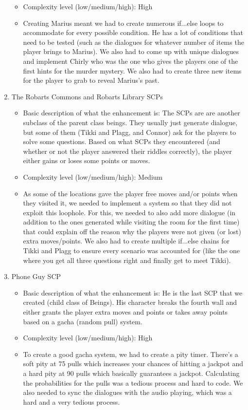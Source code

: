 \documentclass[11pt]{article}
\begin{document}
\begin{enumerate}
\begin{itemize}
    \item Complexity level (low/medium/high): High
    \item Creating Marius meant we had to create numerous if...else loops to accommodate for every possible condition. He has a lot of conditions that need to be tested (such as the dialogues for whatever number of items the player brings to Marius). We also had to come up with unique dialogues and implement Chirly who was the one who gives the players one of the first hints for the murder mystery. We also had to create three new items for the player to grab to reveal Marius's past.
    \end{itemize}
\item The Robarts Commons and Robarts Library SCPs
	\begin{itemize}
	\item Basic description of what the enhancement is: The SCPs are are another subclass of the parent class beings. They usually just generate dialogue, but some of them (Tikki and Plagg, and Connor) ask for the players to solve some questions. Based on what SCPs they encountered (and whether or not the player answered their riddles correctly), the player either gains or loses some points or moves.
	\item Complexity level (low/medium/high): Medium
	\item As some of the locations gave the player free moves and/or points when they visited it, we needed to implement a system so that they did not exploit this loophole. For this, we needed to also add more dialogue (in addition to the ones generated while visiting the room for the first time) that could explain off the reason why the players were not given (or lost) extra moves/points. We also had to create multiple if...else chains for Tikki and Plagg to ensure every scenario was accounted for (like the one where you get all three questions right and finally get to meet Tikki).
	\end{itemize}
\item Phone Guy SCP
	\begin{itemize}
	\item Basic description of what the enhancement is: He is the last SCP that we created (child class of Beings). His character breaks the fourth wall and either grants the player extra moves and points or takes away points based on a gacha (random pull) system.
	\item Complexity level (low/medium/high): High
	\item To create a good gacha system, we had to create a pity timer. There's a soft pity at 75 pulls which increases your chances of hitting a jackpot and a hard pity at 90 pulls which basically guarantees a jackpot. Calculating the probabilities for the pulls was a tedious process and hard to code. We also needed to sync the dialogues with the audio playing, which was a hard and a very tedious process.

\end{itemize}
\end{enumerate}
\end{document}
